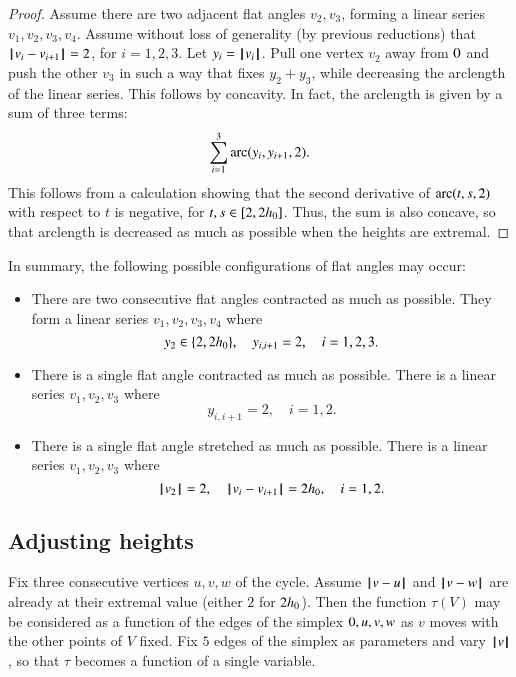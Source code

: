 \begin{proof}
Assume there are two adjacent flat angles $v_2,v_3$, forming a linear series $v_1,v_2,v_3,v_4$.
Assume without loss of generality (by previous reductions) that
${\hskip0.1em|\hskip-0.15em|\hskip0.1em}v_i - v_{i+1}{\hskip0.1em|\hskip-0.15em|\hskip0.1em}=2$, for $i=1,2,3$.
Let $y_i = {{\hskip0.1em|\hskip-0.15em|\hskip0.1em}v_i{\hskip0.1em|\hskip-0.15em|\hskip0.1em}}$.
Pull one vertex $v_2$ away from $0$ and push the other $v_3$ in such a way that fixes $y_2+y_3$, while decreasing the arclength of the linear series.  This follows by concavity.
In fact, the arclength is given by a sum of three terms:
  $$
  \sum_{i=1}^3\operatorname{arc}(y_i,y_{i+1},2).
  $$
This follows from a calculation showing that the second derivative of $\operatorname{arc}(t,s,2)$ with respect to $t$ is negative, for $t,s\in[2,2{h_0}]$.  Thus, the
sum is also concave, so that arclength is decreased as much as possible when the heights are extremal.
\end{proof}

In summary,  the following possible configurations of flat angles may occur:
\begin{itemize}
\item There are two consecutive flat angles contracted as much as possible.  They form a linear series $v_1,v_2,v_3,v_4$ where
$$
y_2\in\{2,2{h_0}\},\quad
y_{i,i+1}=2,\quad i=1,2,3.
$$
\item There is a single flat angle contracted as much as possible.  There
is a linear series $v_1,v_2,v_3$ where
$$
y_{i,i+1}=2,\quad i=1,2.
$$
\item There is a single flat angle stretched as much as possible.  There
is a linear series $v_1,v_2,v_3$ where
$$
{{\hskip0.1em|\hskip-0.15em|\hskip0.1em}v_2{\hskip0.1em|\hskip-0.15em|\hskip0.1em}}=2,\quad
{\hskip0.1em|\hskip-0.15em|\hskip0.1em}v_i - v_{i+1}{\hskip0.1em|\hskip-0.15em|\hskip0.1em}=2{h_0},\quad i=1,2.
$$
\end{itemize}


\subsection{Adjusting heights}

Fix three consecutive vertices $u,v,w$ of the cycle.
Assume ${\hskip0.1em|\hskip-0.15em|\hskip0.1em}v - u{\hskip0.1em|\hskip-0.15em|\hskip0.1em}$ and ${\hskip0.1em|\hskip-0.15em|\hskip0.1em}v - w{\hskip0.1em|\hskip-0.15em|\hskip0.1em}$ are already at their extremal value (either $2$ for  $2{h_0}$).  Then the function $\tau(V)$ may be considered as a function
of the edges of the simplex $0,u,v,w$ as $v$ moves with the other points of $V$ fixed.  Fix $5$ edges of the simplex as parameters and vary ${{\hskip0.1em|\hskip-0.15em|\hskip0.1em}v{\hskip0.1em|\hskip-0.15em|\hskip0.1em}}$, so that $\tau$ becomes a function of a single variable.

